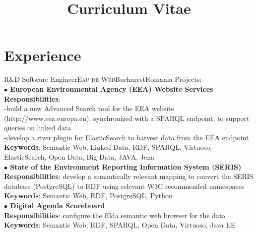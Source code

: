 \documentclass[11pt,a4paper,sans]{moderncv}
\title{Curriculum Vitae}
\begin{document}
\makecvtitle



\section{Experience}
{R\&D Software Engineer}{\textsc{Eau de Web}}{Bucharest}{Romania}
{Projects: \\ 
\textbf{ $\bullet$ European Environmental Agency (EEA) Website Services } \\ 
\textbf{Responsibilities}: \\ 
-build a new Advanced Search tool for the EEA website (http://www.eea.europa.eu), 
synchronized with a SPARQL endpoint, to support queries on linked data \\ 
-develop a river plugin for ElasticSearch to harvest data from the EEA endpoint \\
\textbf{Keywords}: Semantic Web, Linked Data, RDF, SPARQL, Virtuoso, ElasticSearch, Open Data, Big Data, JAVA, Jena \\
\textbf{ $\bullet$ State of the Environment Reporting Information System (SERIS) } \\
\textbf{Responsibilities}: develop a semantically relevant mapping to convert the SERIS database (PostgreSQL) 
to RDF using relevant W3C recommended namespaces  \\
\textbf{Keywords}: Semantic Web, RDF, PostgreSQL, Python\\ 
\textbf{ $\bullet$ Digital Agenda Scoreboard } \\ 
\textbf{Responsibilities}: configure the Elda semantic web browser for the data \\ 
\textbf{Keywords}: Semantic Web, RDF, SPARQL, Open Data, Virtuoso, Java EE }
\end{document}
